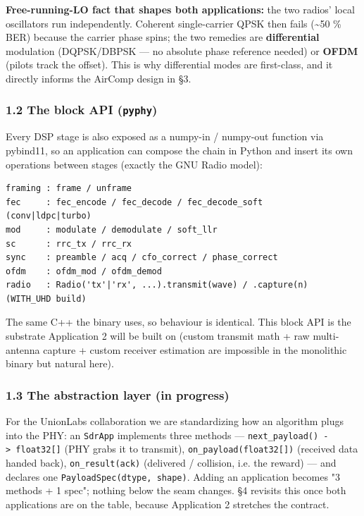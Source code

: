 \documentclass[
  10pt,
]{article}
\begin{document}
\textbf{Free-running-LO fact that shapes both applications:} the two
radios' local oscillators run independently. Coherent single-carrier
QPSK then fails (\textasciitilde50 \% BER) because the carrier phase
spins; the two remedies are \textbf{differential} modulation
(DQPSK/DBPSK --- no absolute phase reference needed) or \textbf{OFDM}
(pilots track the offset). This is why differential modes are
first-class, and it directly informs the AirComp design in §3.

\hypertarget{12-the-block-api-pyphy}{%
\subsubsection{\texorpdfstring{1.2 The block API
(\texttt{pyphy})}{1.2 The block API (pyphy)}}\label{12-the-block-api-pyphy}}

Every DSP stage is also exposed as a numpy-in / numpy-out function via
pybind11, so an application can compose the chain in Python and insert
its own operations between stages (exactly the GNU Radio model):

\begin{verbatim}
framing : frame / unframe
fec     : fec_encode / fec_decode / fec_decode_soft        (conv|ldpc|turbo)
mod     : modulate / demodulate / soft_llr
sc      : rrc_tx / rrc_rx
sync    : preamble / acq / cfo_correct / phase_correct
ofdm    : ofdm_mod / ofdm_demod
radio   : Radio('tx'|'rx', ...).transmit(wave) / .capture(n)      (WITH_UHD build)
\end{verbatim}

The same C++ the binary uses, so behaviour is identical. This block API
is the substrate Application 2 will be built on (custom transmit math +
raw multi-antenna capture + custom receiver estimation are impossible in
the monolithic binary but natural here).

\hypertarget{13-the-abstraction-layer-in-progress}{%
\subsubsection{1.3 The abstraction layer (in
progress)}\label{13-the-abstraction-layer-in-progress}}

For the UnionLabs collaboration we are standardizing how an algorithm
plugs into the PHY: an \texttt{SdrApp} implements three methods ---
\texttt{next\_payload()\ -\textgreater{}\ float32{[}{]}} (PHY grabs it
to transmit), \texttt{on\_payload(float32{[}{]})} (received data handed
back), \texttt{on\_result(ack)} (delivered / collision, i.e. the reward)
--- and declares one \texttt{PayloadSpec(dtype,\ shape)}. Adding an
application becomes "3 methods + 1 spec"; nothing below the seam
changes. §4 revisits this once both applications are on the table,
because Application 2 stretches the contract.
\end{document}
